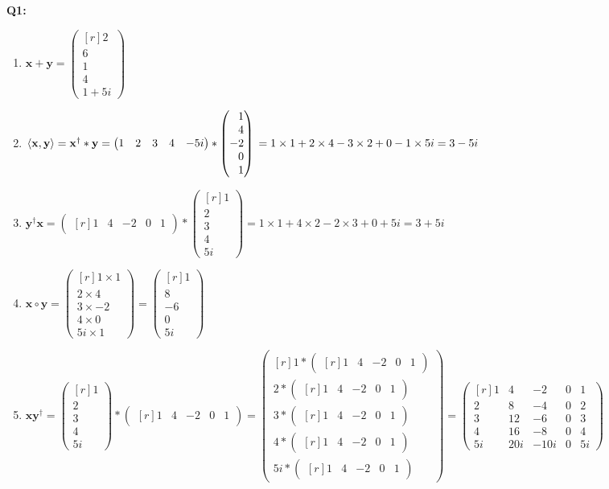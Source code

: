 \documentclass[a4paper,fleqn]{article}
\newcommand{\neweq}[2]{
        #1 = 
        \begin{pmatrix*}[r]
            #2
        \end{pmatrix*}
}
\newcommand{\newvec}[1]{
    \begin{pmatrix*}[r]
        #1
    \end{pmatrix*}
}
\begin{document}
    \Large{\textbf{Q1:}}

    \begin{enumerate}
    \item \(
    \neweq{\mathbf{x} + \mathbf{y}}{2\\6\\1\\4\\1+5i}
    \) 

    \item \(
    \langle\mathbf{x, y}\rangle = \mathbf{x^\dagger*y} 
    = \newvec{1 & 2 & 3 & 4 & -5i}*\newvec{1\\4\\-2\\0\\1} \\
    = 1\times1+2\times4-3\times2+0-1\times5i
    = 3-5i
    \)

    \item \(
    \mathbf{y^\dagger x} 
    = \newvec{1&4&-2&0&1}*\newvec{1\\2\\3\\4\\5i}
    = 1\times1+4\times2-2\times3+0+5i
    = 3+5i
    \)

    \item \(
    \mathbf{x\circ y}
    =\newvec{1\times1\\2\times4\\3\times-2\\4\times0\\5i\times1}
    =\newvec{1\\8\\-6\\0\\5i}
    \)

    \item \(
    \mathbf{xy^\dagger} 
    =\newvec{1\\2\\3\\4\\5i}*\newvec{1&4&-2&0&1}
    =\newvec{1*\newvec{1&4&-2&0&1}\\2*\newvec{1&4&-2&0&1}\\3*\newvec{1&4&-2&0&1}\\4*\newvec{1&4&-2&0&1}\\5i*\newvec{1&4&-2&0&1}}
    =\newvec{1&4&-2&0&1\\2&8&-4&0&2\\3&12&-6&0&3\\4&16&-8&0&4\\5i&20i&-10i&0&5i}
    \)


\end{enumerate}
\end{document}
